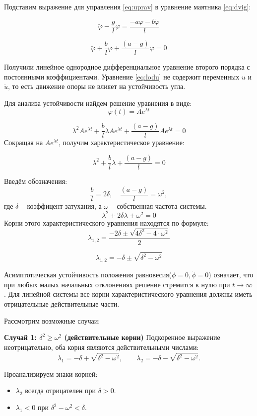 \documentclass[a4paper, 12pt]{article}
\begin{document}
Подставим выражение для управления \eqref{eq:uprav} в уравнение маятника \eqref{eq:dvig}:

\begin{equation}
\ddot{\varphi} - \frac{g}{l} \varphi = \frac{-a\varphi - b\dot{\varphi}}{l}
\end{equation}

\begin{equation}
\ddot{\varphi} + \frac{b}{l} \dot{\varphi} + \frac{(a - g)}{l} \varphi = 0
\label{eq:lodu}
\end{equation}

Получили линейное однородное дифференциальное уравнение второго порядка с постоянными коэффициентами. Уравнение \eqref{eq:lodu} не содержит переменных $u$ и $\ddot{u}$, то есть движение опоры не влияет на устойчивость угла.

Для анализа устойчивости найдем решение уравнения в виде:
\[
\varphi(t) = Ae^{\lambda t}
\]

\[
\lambda^2A e^{\lambda t} + \frac{b}{l} \lambda Ae^{\lambda t} + \frac{(a - g)}{l} Ae^{\lambda t} = 0
\]
Сокращая на $Ae^{\lambda t}$, получим характеристическое уравнение:

\[
\lambda^2 + \frac{b}{l} \lambda + \frac{(a - g)}{l} = 0
\]

Введём обозначения:
\[
\frac{b}{l} = 2\delta, \quad \frac{(a - g)}{l} = \omega^2,
\]
где $\delta-$коэффицент затухания, а $\omega-$собственная частота системы.
\[
\lambda^2 + 2\delta\lambda + \omega^2 = 0
\]
Корни этого характеристического уравнения находятся по формуле:
\[
\lambda_{1,2} = \frac{-2\delta \pm \sqrt{4\delta^2 - 4 \cdot \omega^2}}{2}
\]

\[
\lambda_{1,2} = -\delta \pm \sqrt{\delta^2 - \omega^2}
\]

Асимптотическая устойчивость положения равновесия($\phi = 0, \dot{\phi}=0$) означает, что при любых малых начальных отклонениях решение стремится к нулю при $t \to \infty$. Для линейной системы все корни характеристического уравнения должны иметь отрицательные действительные части.

Рассмотрим возможные случаи:

\textbf{Случай 1: \( \delta^2 \geq \omega^2 \) (действительные корни)}
Подкоренное выражение неотрицательно, оба корня являются действительными числами:
\[
\lambda_1 = -\delta + \sqrt{\delta^2 - \omega^2},\qquad
\lambda_2 = -\delta - \sqrt{\delta^2 - \omega^2}.
\]

Проанализируем знаки корней:

\begin{itemize}
\item \(\lambda_2\) всегда отрицателен при \(\delta > 0\).
\item \(\lambda_1 < 0\) при \(\delta^2 - \omega^2 < \delta\).
\end{itemize}
\end{document}
